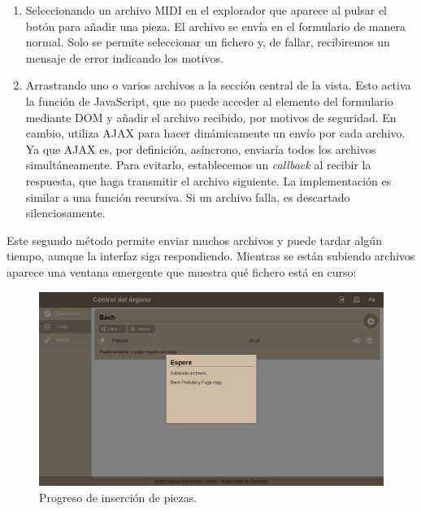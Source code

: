 \begin{enumerate}
	\item Seleccionando un archivo \acrshort{MIDI} en el explorador que aparece al pulsar el botón para añadir una pieza. El archivo se envía en el formulario de manera normal. Solo se permite seleccionar un fichero y, de fallar, recibiremos un mensaje de error indicando los motivos.
	
	\item Arrastrando uno o varios archivos a la sección central de la vista. Esto activa la función  de JavaScript, que no puede acceder al elemento  del formulario mediante \acrshort{DOM} y añadir el archivo recibido, por motivos de seguridad. En cambio, utiliza \acrshort{AJAX} para hacer dinámicamente un envío por cada archivo. Ya que \acrshort{AJAX} es, por definición, asíncrono, enviaría todos los archivos simultáneamente. Para evitarlo, establecemos un \textit{callback} al recibir la respuesta, que haga transmitir el archivo siguiente. La implementación es similar a una función recursiva. Si un archivo falla, es descartado silenciosamente.
\end{enumerate}

Este segundo método permite enviar muchos archivos y puede tardar algún tiempo, aunque la interfaz siga respondiendo. Mientras se están subiendo archivos aparece una ventana emergente que muestra qué fichero está en curso:

\smallskip

\begin{figure}[H]
	\noindent \begin{centering}
		\includegraphics[width=\linewidth*3/4]{capitulo5/cap_ins_pieza}
		\par\end{centering}
	\smallskip
	\caption{\label{fig:cap_ins_pieza} Progreso de inserción de piezas.}
\end{figure} 


